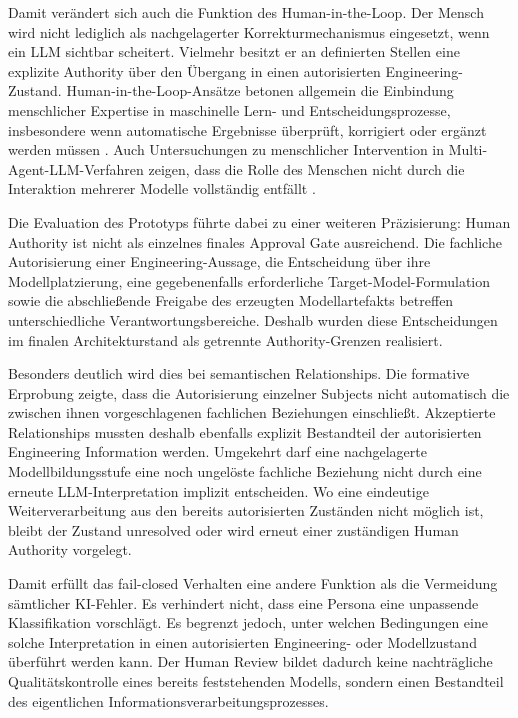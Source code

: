 Damit verändert sich auch die Funktion des Human-in-the-Loop. Der Mensch wird
nicht lediglich als nachgelagerter Korrekturmechanismus eingesetzt, wenn ein
LLM sichtbar scheitert. Vielmehr besitzt er an definierten Stellen eine
explizite Authority über den Übergang in einen autorisierten
Engineering-Zustand. Human-in-the-Loop-Ansätze betonen allgemein die
Einbindung menschlicher Expertise in maschinelle Lern- und
Entscheidungsprozesse, insbesondere wenn automatische Ergebnisse überprüft,
korrigiert oder ergänzt werden müssen
\cite{MosqueiraRey2023,Lazaros2026}. Auch Untersuchungen zu menschlicher
Intervention in Multi-Agent-LLM-Verfahren zeigen, dass die Rolle des Menschen
nicht durch die Interaktion mehrerer Modelle vollständig entfällt
\cite{TriemDing2024}.

Die Evaluation des Prototyps führte dabei zu einer weiteren Präzisierung:
Human Authority ist nicht als einzelnes finales Approval Gate ausreichend.
Die fachliche Autorisierung einer Engineering-Aussage, die Entscheidung über
ihre Modellplatzierung, eine gegebenenfalls erforderliche
Target-Model-Formulation sowie die abschließende Freigabe des erzeugten
Modellartefakts betreffen unterschiedliche Verantwortungsbereiche. Deshalb
wurden diese Entscheidungen im finalen Architekturstand als getrennte
Authority-Grenzen realisiert.

Besonders deutlich wird dies bei semantischen Relationships. Die formative
Erprobung zeigte, dass die Autorisierung einzelner Subjects nicht automatisch
die zwischen ihnen vorgeschlagenen fachlichen Beziehungen einschließt.
Akzeptierte Relationships mussten deshalb ebenfalls explizit Bestandteil der
autorisierten Engineering Information werden. Umgekehrt darf eine
nachgelagerte Modellbildungsstufe eine noch ungelöste fachliche Beziehung
nicht durch eine erneute LLM-Interpretation implizit entscheiden. Wo eine
eindeutige Weiterverarbeitung aus den bereits autorisierten Zuständen nicht
möglich ist, bleibt der Zustand unresolved oder wird erneut einer zuständigen
Human Authority vorgelegt.

Damit erfüllt das fail-closed Verhalten eine andere Funktion als die
Vermeidung sämtlicher KI-Fehler. Es verhindert nicht, dass eine Persona eine
unpassende Klassifikation vorschlägt. Es begrenzt jedoch, unter welchen
Bedingungen eine solche Interpretation in einen autorisierten
Engineering- oder Modellzustand überführt werden kann. Der Human Review bildet
dadurch keine nachträgliche Qualitätskontrolle eines bereits feststehenden
Modells, sondern einen Bestandteil des eigentlichen
Informationsverarbeitungsprozesses.

